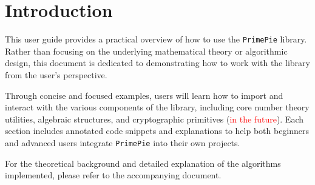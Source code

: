 \chapter{Introduction}

This user guide provides a practical overview of how to use the \texttt{PrimePie} library. Rather than focusing on the underlying mathematical theory or algorithmic design, this document is dedicated to demonstrating how to work with the library from the user's perspective.

Through concise and focused examples, users will learn how to import and interact with the various components of the library, including core number theory utilities, algebraic structures, and cryptographic primitives (\textcolor{red}{in the future}). Each section includes annotated code snippets and explanations to help both beginners and advanced users integrate \texttt{PrimePie} into their own projects.

For the theoretical background and detailed explanation of the algorithms implemented, please refer to the accompanying document.
